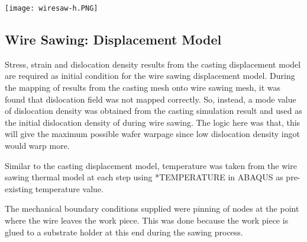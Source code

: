 \noindent
\begin{minipage}[c]{\textwidth}
\centering
        \captionsetup{type=figure}
        \texttt{[image: wiresaw-h.PNG]}
        \label{fig:wiresaw-h}
\end{minipage}

\subsection{Wire Sawing: Displacement Model}

Stress, strain and dislocation density results from the casting displacement model are required as initial condition for the wire sawing displacement model. During the mapping of results from the casting mesh onto wire sawing mesh, it was found that dislocation field was not mapped correctly. So, instead, a mode value of dislocation density was obtained from the casting simulation result and used as the initial dislocation density of during wire sawing. The logic here was that, this will give the maximum possible wafer warpage since low dislocation density ingot would warp more. 

Similar to the casting displacement model, temperature was taken from the wire sawing thermal model at each step using *TEMPERATURE in ABAQUS as pre-existing temperature value.  

The mechanical boundary conditions supplied were pinning of nodes at the point where the wire leaves the work piece. This was done because the work piece is glued to a substrate holder at this end during the sawing process. 


